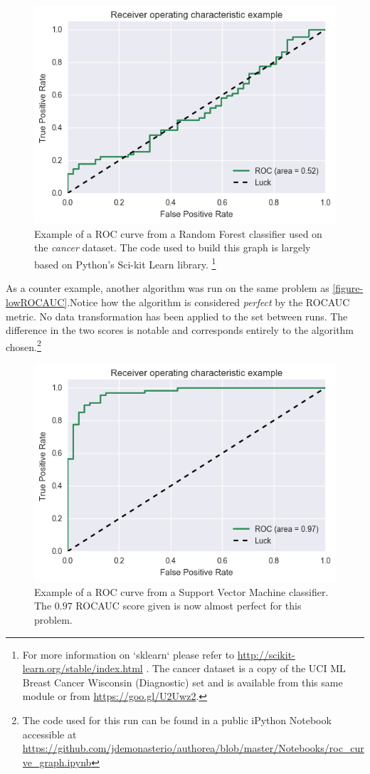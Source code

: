 \begin{figure}[h!]
\begin{center}
\includegraphics[width=0.7\columnwidth]{figures/figure-lowROCAUC/figure-lowROCAUC_original}
\caption{Example of a ROC curve from a Random Forest classifier used on the \textit{cancer} dataset. The code used to build this graph is largely based on Python's Sci-kit Learn library. \protect\footnote{For more information on `sklearn` please refer to \url{http://scikit-learn.org/stable/index.html} \protect\textcite{sci-kit} . The cancer dataset is a copy of the UCI ML Breast Cancer Wisconsin (Diagnostic) set and is available from this same module or from \url{https://goo.gl/U2Uwz2}.} }
\end{center}
\end{figure}
%

As a counter example, another algorithm was run on the same problem as \cref{figure-lowROCAUC}.Notice how the algorithm is considered \textit{perfect} by the ROCAUC metric. No data transformation has been applied to the set between runs. The difference in the two scores is notable and corresponds entirely to the algorithm chosen.\footnote{The code used for this run can be found in a public iPython Notebook accessible at \url{https://github.com/jdemonasterio/authorea/blob/master/Notebooks/roc_curve_graph.ipynb}}

\begin{figure}[h!]
\begin{center}
\includegraphics[width=0.7\columnwidth]{figures/figure-highROCAUC/figure-highROCAUC}
\caption{Example of a ROC curve from a Support Vector Machine classifier. The $0.97$ ROCAUC score given is now almost perfect for this problem.%
}
\end{center}
\end{figure}

